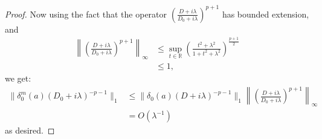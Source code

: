 \begin{proof}
        
        Now using the fact that the operator $\left(\frac{D+i\lambda}{D_0+i\lambda}\right)^{p+1}$ has bounded extension, { and
        \begin{align*}
            \left\|\left(\frac{D+i\lambda}{D_0+i\lambda}\right)^{p+1}\right\|_\infty &\leq \sup_{t \in \mathbb{R}} \left(\frac{t^2+\lambda^2}{1+t^2+\lambda^2}\right)^{\frac{p+1}{2}}\\
                                                                                     &\leq 1,
        \end{align*}
        we get:}
        \begin{align*}
            \|\delta_0^m(a)(D_0+i\lambda)^{-p-1}\|_1 &\leq \|\delta_0(a)(D+i\lambda)^{-p-1}\|_1\left\|\left(\frac{D+i\lambda}{D_0+i\lambda}\right)^{p+1}\right\|_\infty\\
                                                     &= O(\lambda^{-1})
        \end{align*}
        as desired.
        
    \end{proof}
    
